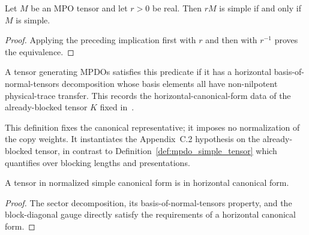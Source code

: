 \begin{lemma}
    \label{thm:mpdo_simple_positive_rescaling_iff}
    \leanok
    Let $M$ be an MPO tensor and let $r>0$ be real. Then $rM$ is simple
    if and only if $M$ is simple.
\end{lemma}

\begin{proof}\leanok
    Applying the preceding implication first with $r$ and then with $r^{-1}$
    proves the equivalence.
\end{proof}
\begin{definition}
    \label{def:mpdo_simple_cf_tensor}
    \leanok
    A tensor generating MPDOs satisfies this predicate if it has a
    horizontal basis-of-normal-tensors decomposition whose basis elements all
    have non-nilpotent physical-trace transfer. This records the
    horizontal-canonical-form data of the already-blocked tensor $K$ fixed
    in~\cite[Appendix~C.2, line~1628]{Cirac2016MPDO_arXiv}.

    This definition fixes the canonical representative; it imposes no
    normalization of the copy weights. It instantiates the Appendix~C.2 hypothesis on the already-blocked tensor, in
    contrast to Definition~\ref{def:mpdo_simple_tensor} which quantifies over
    blocking lengths and presentations.
\end{definition}

\begin{lemma}
    \label{lem:mpdo_simple_tensor_horizontal_cf}
    \leanok
    A tensor in normalized simple canonical form is in horizontal canonical form.
\end{lemma}

\begin{proof}\leanok
    The sector decomposition, its basis-of-normal-tensors property, and the
    block-diagonal gauge directly satisfy the requirements of a horizontal
    canonical form.
\end{proof}

